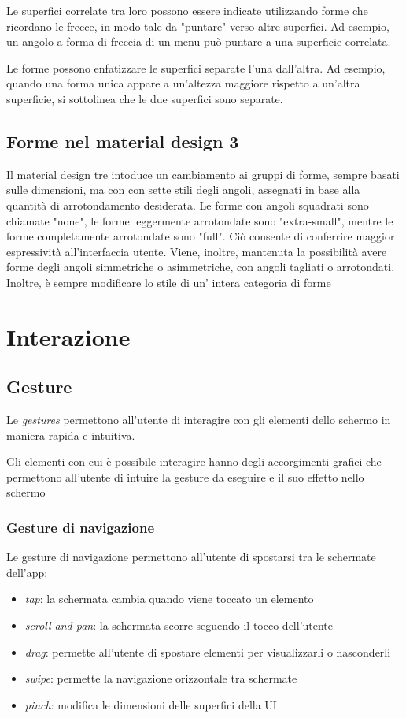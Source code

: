 \documentclass[12pt, a4paper]{report}
\begin{document}
	Le superfici correlate tra loro possono essere indicate utilizzando forme che ricordano le frecce, in modo tale da "puntare" verso altre superfici. Ad esempio, un angolo a forma di freccia di un menu può puntare a una superficie correlata.


	Le forme possono enfatizzare le superfici separate l'una dall'altra. Ad esempio, quando una forma unica appare a un'altezza maggiore rispetto a un'altra superficie, si sottolinea che le due superfici sono separate.

	\subsection{Forme nel material design 3}
	Il material design tre intoduce un cambiamento ai gruppi di forme, sempre basati sulle dimensioni, ma con con sette stili degli angoli, assegnati in base alla quantità di arrotondamento desiderata. Le forme con angoli squadrati sono chiamate "none", le forme leggermente arrotondate sono "extra-small", mentre le forme completamente arrotondate sono "full".
	Ciò consente di conferrire maggior espressività all'interfaccia utente. Viene, inoltre, mantenuta la possibilità avere forme degli angoli simmetriche o asimmetriche, con angoli tagliati o arrotondati. Inoltre, è sempre modificare lo stile di un' intera categoria di forme

	\section{Interazione}

		\subsection{Gesture}	
		Le \textit{gestures} permettono all'utente di interagire con gli elementi dello schermo in maniera rapida e intuitiva.
		
		Gli elementi con cui è possibile interagire hanno degli accorgimenti grafici che permettono all'utente di intuire la gesture da eseguire e il suo effetto nello schermo
		
			\subsubsection{Gesture di navigazione}
			Le gesture di navigazione permettono all'utente di spostarsi tra le schermate dell'app:
			\begin{itemize}
				\item \textit{tap}: la schermata cambia quando viene toccato un elemento
				\item \textit{scroll and pan}: la schermata scorre seguendo il tocco dell'utente
				\item \textit{drag}: permette all'utente di spostare elementi per visualizzarli o nasconderli
				\item \textit{swipe}: permette la navigazione orizzontale tra schermate
				\item \textit{pinch}: modifica le dimensioni delle superfici della UI
			\end{itemize}
			
\end{document}
